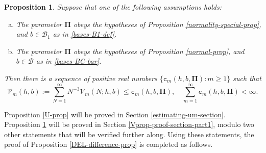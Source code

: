 \documentclass[12pt, twoside]{article}
\newtheorem{proposition}[theorem]{Proposition}
\theoremstyle{definition}
\numberwithin{equation}{section}
\begin{document}
\begin{proposition} \label{V-prop} 
Suppose that one of the following assumptions holds:
\begin{enumerate}[(a)] 
\item The parameter $\pmb{\Pi}$ obeys the hypotheses of Proposition \ref{normality-special-prop}, and $b \in \mathscr{B}_1$ as in \eqref{bases-B1-def}. 
\item  The parameter $\pmb{\Pi}$ obeys the hypotheses of Proposition \ref{normal-prop}, and $b \in \mathscr{B}$ as in \eqref{bases-BC-bar}. 
\end{enumerate} 
Then there is a sequence of positive real numbers $\{\mathtt c_m(h, b, \pmb{\Pi}) : m \geq 1\}$ such that  
\begin{equation} \label{Vm-sum} 
\mathcal V_m(h,b) := \sum_{N=1}^{\infty} N^{-3} \mathscr{V}_m(N; h, b)  \leq \mathtt c_m(h, b, \pmb{\Pi}), \quad \sum_{m=1}^{\infty} \mathtt c_m(h, b, \pmb{\Pi}) < \infty. 
\end{equation} 
\end{proposition}  
\noindent Proposition \ref{U-prop} will be proved in Section \ref{estimating-um-section}. Proposition \ref{V-prop} will be proved in Section \ref{Vprop-proof-section-part1}, modulo two other statements that will be verified further along. Using these statements, the proof of Proposition \ref{DEL-difference-prop} is completed as follows.  
\end{document}
